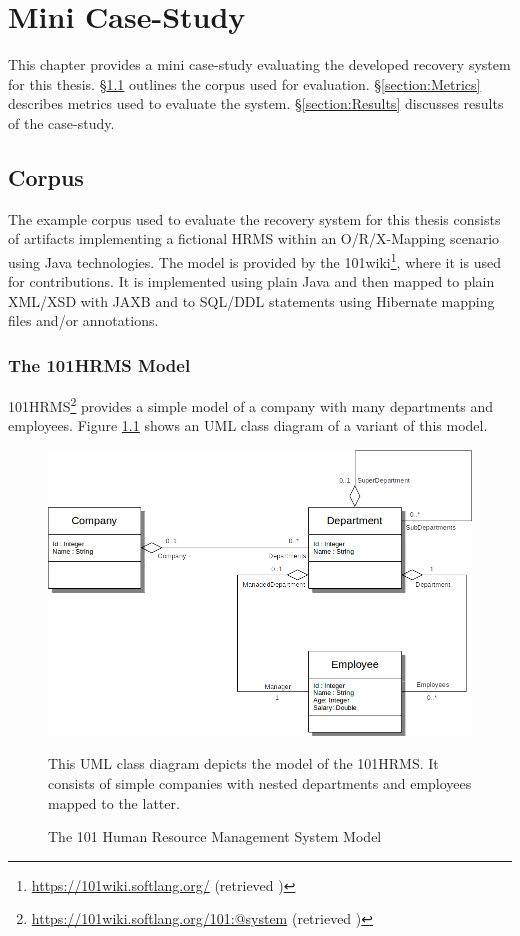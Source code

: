 \chapter{Mini Case-Study}
\label{chapter:MiniCaseStudy}
This chapter provides a mini case-study evaluating the developed recovery system for this thesis.
§\ref{section:ExampleCorpus} outlines the corpus used for evaluation.
§\ref{section:Metrics} describes metrics used to evaluate the system.
§\ref{section:Results} discusses results of the case-study.

\section{Corpus}
\label{section:ExampleCorpus}
The example corpus used to evaluate the recovery system for this thesis consists of artifacts implementing a fictional \gls{HRMS} within an \gls{O/R/X-Mapping} scenario using \gls{Java} technologies.
The model is provided by the 101wiki\footnote{\url{https://101wiki.softlang.org/} (retrieved )}, where it is used for contributions.
It is implemented using plain \Gls{Java} and then mapped to plain \gls{XML}/\gls{XSD} with \gls{JAXB} and to \gls{SQL/DDL} statements using \gls{Hibernate} mapping files and/or annotations.



\subsection{The 101HRMS Model}
\gls{101HRMS}\footnote{\url{https://101wiki.softlang.org/101:@system} (retrieved )} provides a simple model of a company with many departments and employees.
Figure \ref{figure:101HRMSModel} shows an \gls{UML} class diagram of a variant of this model.

\begin{figure}[h!]
\begin{center}
\includegraphics[scale=.5]{images/101HRMSModel.png}
\end{center}
{
\scriptsize 
This \gls{UML} class diagram depicts the model of the \gls{101HRMS}.
It consists of simple companies with nested departments and employees mapped to the latter.
}
\caption{The 101 Human Resource Management System Model}
\label{figure:101HRMSModel}
\end{figure}


